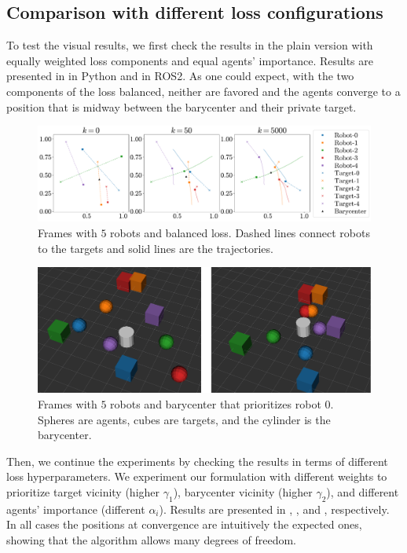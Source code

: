 \documentclass[a4paper,11pt,oneside]{book}
\begin{document}
\subsection{Comparison with different loss configurations}

To test the visual results, we first check the results in the plain version with equally weighted loss components and equal agents' importance. Results are presented in  in Python and  in ROS2. As one could expect, with the two components of the loss balanced, neither are favored and the agents converge to a position that is midway between the barycenter and their private target.
\begin{figure}[h!]
      \centering
      \includegraphics[width=0.9\linewidth]{./figs/aggregative/plain_anim/anim.pdf} 
      \caption{Frames with $5$ robots and balanced loss. Dashed lines connect robots to the targets and solid lines are the trajectories.}
      \label{fig:anim_plain}
\end{figure}

\begin{figure}[h!]
      \centering
      \includegraphics[width=0.75\linewidth]{./figs/aggregative/plain_anim/ros2.png} 
      \caption{Frames with $5$ robots and barycenter that prioritizes robot $0$. Spheres are agents, cubes are targets, and the cylinder is the barycenter.}
      \label{fig:anim_plain_ros2}
\end{figure}

Then, we continue the experiments by checking the results in terms of different loss hyperparameters. We experiment our formulation with different weights to prioritize target vicinity (higher $\gamma_1$), barycenter vicinity (higher $\gamma_2$), and different agents' importance (different $\alpha_i$). Results are presented in , , and , respectively. In all cases the positions at convergence are intuitively the expected ones, showing that the algorithm allows many degrees of freedom.
\end{document}
